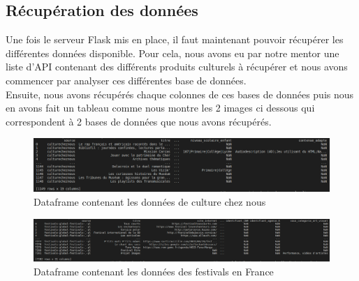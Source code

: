 \documentclass{article}
\begin{document}
\subsection{Récupération des données}
Une fois le serveur Flask mis en place, il faut maintenant pouvoir récupérer les différentes données disponible. Pour cela, nous avons eu par notre mentor une liste d'API contenant des différents produits culturels à récupérer et nous avons commencer par analyser ces différentes base de données.\\
Ensuite, nous avons récupérés chaque colonnes de ces bases de données puis nous en avons fait un tableau comme nous montre les 2 images ci dessous qui correspondent à 2 bases de données que nous avons récupérés.\\
\begin{figure}[H]
\hspace{-25mm}
\includegraphics[scale = 0.44]{images/culturecheznous.png}
\caption{Dataframe contenant les données de culture chez nous}
\end{figure}
\begin{figure}[H]
\hspace{-25mm}
\includegraphics[scale = 0.354]{images/festivals.png}
\caption{Dataframe contenant les données des festivals en France}
\end{figure}
\end{document}
